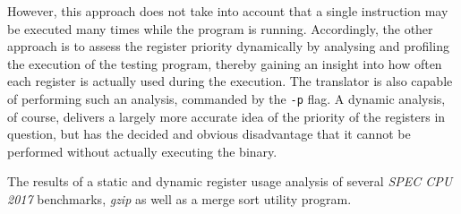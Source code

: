 However, this approach does not take into account that a single instruction may be executed many times while the program is running.
Accordingly, the other approach is to assess the register priority dynamically by analysing and profiling the execution of the testing program, thereby gaining an insight into how often each register is actually used during the execution.
The translator is also capable of performing such an analysis, commanded by the \texttt{-p} flag.
A dynamic analysis, of course, delivers a largely more accurate idea of the priority of the registers in question, but has the decided and obvious disadvantage that it cannot be performed without actually executing the binary.

\begin{table}
	\centering
	\caption{The results of a static and dynamic register usage analysis of several \textit{SPEC CPU 2017} benchmarks, \textit{gzip} as well as a merge sort utility program.}
	\label{tab:register-analysis-results}
\end{table}

